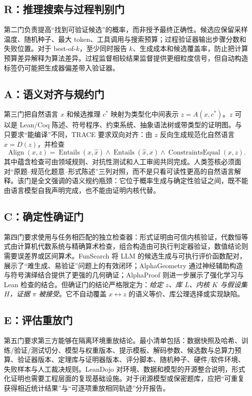 \documentclass[UTF8,11pt,a4paper,fontset=fandol]{ctexart}
\newcommand{\trace}{\textsf{TRACE}}
\begin{document}
\subsection{R：推理搜索与过程判别门}
第二门负责提高“找到可验证候选”的概率，而非授予最终正确性。候选应保留采样温度、随机种子、最大 token、工具调用与搜索预算；过程验证器输出步骤分数和失败位置。对于 best-of-$k$，至少同时报告 $k$、生成成本和候选覆盖率，防止把计算预算差异解释为算法差异。过程监督相较结果监督提供更细粒度信号\cite{lightman2024verify}，但自动构造标签仍可能把生成器偏差带入验证器\cite{wang2024mathshepherd}。

\subsection{A：语义对齐与规约门}
第三门把自然语言 $x$ 和候选推理 $c^*$ 映射为类型化中间表示 $z=A(x,c^*)$。$z$ 可以是 Lean/Coq 陈述、符号程序、约束系统、抽象语法树或带类型的证明图。与只要求“能编译”不同，\trace{} 要求双向对齐：由 $z$ 反向生成规范化自然语言 $\hat{x}=D(z)$，并检查
\begin{equation}
\operatorname{Align}(x,z)=
\operatorname{Entails}(x,\hat{x})\land
\operatorname{Entails}(\hat{x},x)\land
\operatorname{ConstraintsEqual}(x,z).
\label{eq:alignment}
\end{equation}
其中蕴含检查可由领域规则、对抗性测试和人工审阅共同完成。人类签核必须面对“原题--规范化题意--形式陈述”三列对照，而不是只看可读性更高的自然语言解释。该门是全文强调的语义规约瓶颈：它位于概率生成与确定性验证之间，既不能由语言模型自我声明完成，也不能由证明内核代替。

\subsection{C：确定性确证门}
第四门要求使用与任务相匹配的独立检查器：形式证明由可信内核验证，代数恒等式由计算机代数系统与精确算术检查，组合构造由可执行判定器验证，数值结论则需要误差界或区间算术。FunSearch 将 LLM 的候选生成与可执行评价函数配对，展示了“难生成、易验证”问题上的有效闭环\cite{romeraparedes2024funsearch}；AlphaGeometry 通过神经辅助构造与符号演绎结合提供了更强的几何确证\cite{trinh2024alphageometry}；AlphaProof 则进一步展示了强化学习与 Lean 检查的结合\cite{hubert2026alphaproof}。但确证门的结论严格限定为：\emph{给定 $z$、库 $L$、内核 $K$ 与假设集 $H$，证据 $\pi$ 被接受}。它不自动覆盖 $x\leftrightarrow z$ 的语义等价、库公理选择或实现缺陷。

\subsection{E：评估重放门}
第五门要求第三方能够在隔离环境重放结论。最小清单包括：数据快照及哈希、训练/验证/测试切分、模型与权重版本、提示模板、解码参数、候选数与总算力预算、验证器版本、定理库与证明器版本、评分脚本、随机种子、硬件/软件环境、失败样本与人工裁决规则。LeanDojo 对环境、数据和模型的开源整合说明，形式化证明也需要工程层面的复现基础设施\cite{yang2023leandojo}。对于闭源模型或保密题库，应把“可重复获得相近统计结果”与“可逐项重放相同轨迹”分开报告。
\end{document}

